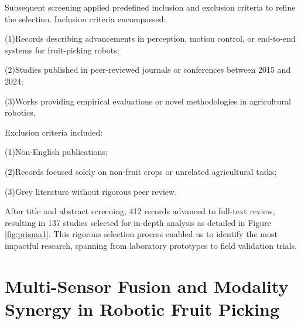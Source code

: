 \documentclass[a4paper,fleqn]{cas-dc}
\begin{document}
Subsequent screening applied predefined inclusion and exclusion criteria to refine the selection. Inclusion criteria encompassed:

(1)Records describing advancements in perception, motion control, or end-to-end systems for fruit-picking robots;

(2)Studies published in peer-reviewed journals or conferences between 2015 and 2024;

(3)Works providing empirical evaluations or novel methodologies in agricultural robotics.

Exclusion criteria included:

(1)Non-English publications;

(2)Records focused solely on non-fruit crops or unrelated agricultural tasks;

(3)Grey literature without rigorous peer review.

After title and abstract screening, 412 records advanced to full-text review, resulting in 137 studies selected for in-depth analysis as detailed in Figure \ref{fig:prisma1}. This rigorous selection process enabled us to identify the most impactful research, spanning from laboratory prototypes to field validation trials. 



\section{Multi-Sensor Fusion and Modality Synergy in Robotic Fruit Picking}
\end{document}

